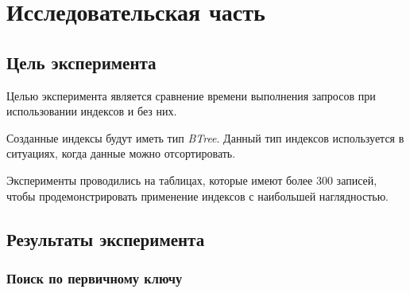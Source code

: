 \chapter{Исследовательская часть}

\section{Цель эксперимента}

Целью эксперимента является сравнение времени выполнения запросов при использовании индексов и без них. 

Созданные индексы будут иметь тип \textit{BTree}. Данный тип индексов используется в ситуациях, когда данные можно отсортировать.

Эксперименты проводились на таблицах, которые имеют более 300 записей, чтобы продемонстрировать применение индексов с наибольшей наглядностью.






\section{Результаты эксперимента}

\subsection{Поиск по первичному ключу}

